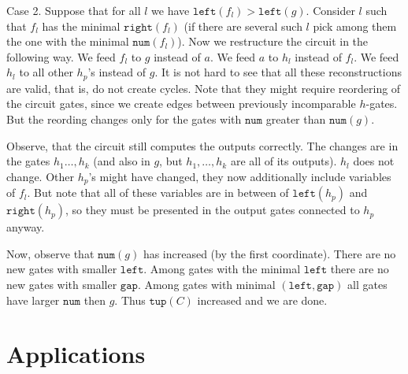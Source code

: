 \documentclass[11pt,letterpaper]{article}
\newcommand{\lef}{\texttt{left}}
\newcommand{\righ}{\texttt{right}}
\newcommand{\gap}{\texttt{gap}}
\newcommand{\num}{\texttt{num}}
\newcommand{\tup}{\texttt{tup}}
\begin{document}
Case 2. Suppose that for all $l$ we have $\lef(f_l)>\lef(g)$. Consider $l$ such that $f_l$ has the minimal $\righ(f_l)$ (if there are several such $l$ pick among them the one with the minimal $\num(f_l)$). Now we restructure the circuit in the following way. We feed $f_l$ to $g$ instead of $a$. We feed $a$ to $h_l$ instead of $f_l$. We feed $h_l$ to all other $h_p$'s instead of $g$. It is not hard to see that all these reconstructions are valid, that is, do not create cycles. Note that they might require reordering of the circuit gates, since we create edges between previously incomparable $h$-gates. But the reording changes only for the gates with $\num$ greater than $\num(g)$.

Observe, that the circuit still computes the outputs correctly. The changes are in the gates $h_1\ldots, h_k$ (and also in $g$, but $h_1,\ldots, h_k$ are all of its outputs). $h_l$ does not change. Other $h_p$'s might have changed, they now additionally include variables of $f_l$. But note that all of these variables are in between of $\lef(h_p)$ and $\righ(h_p)$, so they must be presented in the output gates connected to $h_p$ anyway.

Now, observe that $\num(g)$ has increased (by the first coordinate). There are no new gates with smaller $\lef$. Among gates with the minimal $\lef$ there are no new gates with smaller $\gap$. Among gates with minimal $(\lef,\gap)$ all gates have larger $\num$ then $g$. Thus $\tup(C)$ increased and we are done.

\section{Applications}



\end{document}
